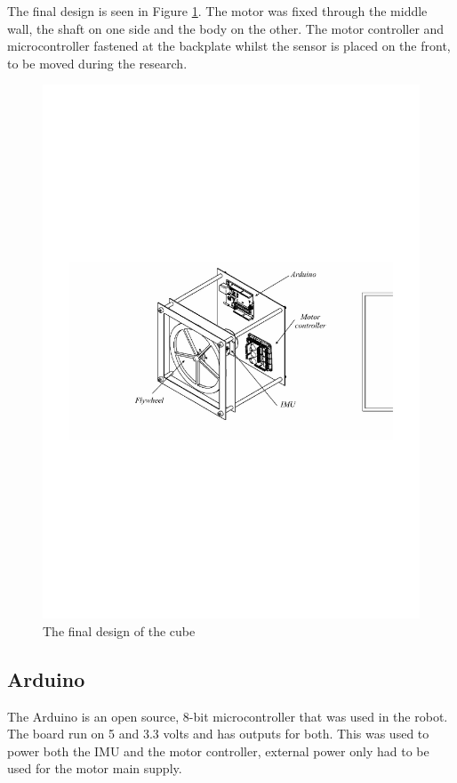 \documentclass[a4paper,11pt]{kth-mag}
\begin{document}
The final design is seen in Figure \ref{Fig: final design}. The motor was fixed through the middle wall, the shaft on one side and the body on the other. The motor controller and microcontroller fastened at the backplate whilst the sensor is placed on the front, to be moved during the research.



\begin{figure}[!htb]
\centering
\includegraphics[trim=5cm 10cm 5cm 9cm, clip=true,scale=.9]{Finaldesign.pdf}
\caption{The final design of the cube}
\label{Fig: final design}
\end{figure}

\subsection{Arduino}
The Arduino is an open source, 8-bit microcontroller that was used in the robot. 
The board run on 5 and 3.3 volts and has outputs for both. This was used to power both the IMU and the motor controller, external power only had to be used for the motor main supply.
\end{document}
